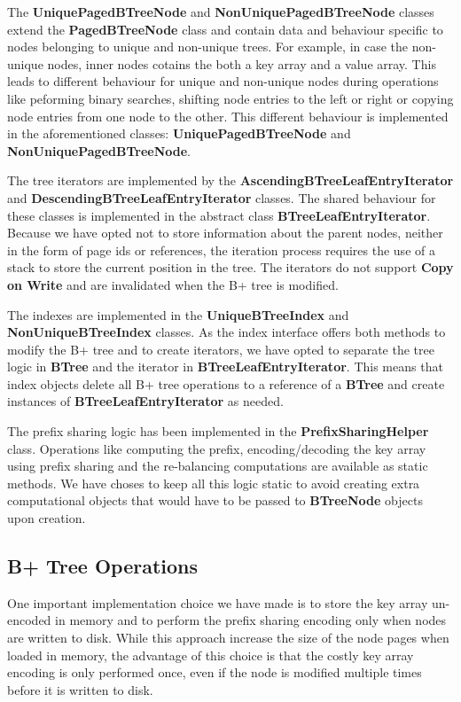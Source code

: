 \documentclass[11pt,a4paper,oneside]{article}
\begin{document}
The \textbf{UniquePagedBTreeNode} and \textbf{NonUniquePagedBTreeNode} classes extend the \textbf{PagedBTreeNode} class and contain data and behaviour specific to nodes belonging to unique and non-unique trees. For example, in case the non-unique nodes, inner nodes cotains the both a key array and a value array. This leads to different behaviour for unique and non-unique nodes during operations like peforming binary searches, shifting node entries to the left or right or copying node entries from one node to the other. This different behaviour is implemented in the aforementioned classes: \textbf{UniquePagedBTreeNode} and \textbf{NonUniquePagedBTreeNode}. 

The tree iterators are implemented by the \textbf{AscendingBTreeLeafEntryIterator} and \textbf{DescendingBTreeLeafEntryIterator} classes. The shared behaviour for these classes is implemented in the abstract class \textbf{BTreeLeafEntryIterator}. Because we have opted not to store information about the parent nodes, neither in the form of page ids or references, the iteration process requires the use of a stack to store the current position in the tree. The iterators do not support \textbf{Copy on Write} and are invalidated when the B+ tree is modified. 

The indexes are implemented in the \textbf{UniqueBTreeIndex} and \textbf{NonUniqueBTreeIndex} classes. As the index interface offers both methods to modify the B+ tree and to create iterators, we have opted to separate the tree logic in \textbf{BTree} and the iterator in \textbf{BTreeLeafEntryIterator}. This means that index objects delete all B+ tree operations to a reference of a \textbf{BTree} and create instances of \textbf{BTreeLeafEntryIterator} as needed.

The prefix sharing logic has been implemented in the \textbf{PrefixSharingHelper} class. Operations like computing the prefix, encoding/decoding the key array using prefix sharing and the re-balancing computations are available as static methods. We have choses to keep all this logic static to avoid creating extra computational objects that would have to be passed to \textbf{BTreeNode} objects upon creation.

\subsection{B+ Tree Operations} %
\label{sub:b_tree_operations}
One important implementation choice we have made is to store the key array un-encoded in memory and to perform the prefix sharing encoding only when nodes are written to disk. While this approach increase the size of the node pages when loaded in memory, the advantage of this choice is that the costly key array encoding is only performed once, even if the node is modified multiple times before it is written to disk. 
\end{document}
